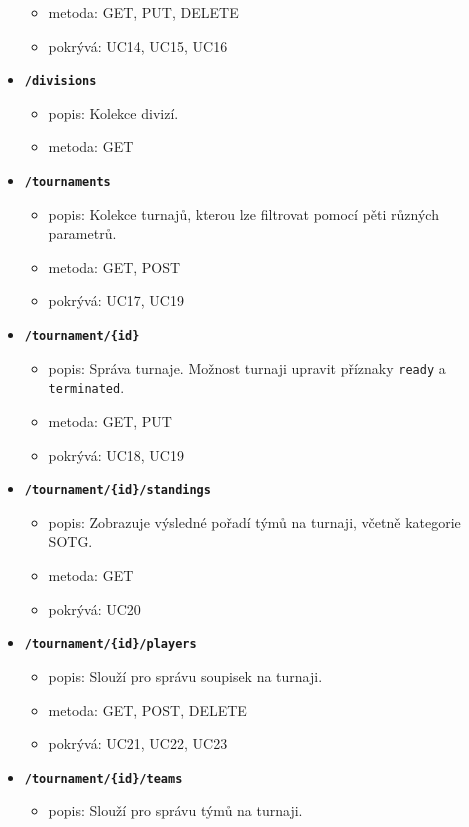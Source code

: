 \begin{itemize}
\begin{itemize}
    \item metoda: GET, PUT, DELETE
    \item pokrývá: UC14, UC15, UC16
  \end{itemize}
  \item \texttt{\textbf{/divisions}}
  \begin{itemize}
    \item popis: Kolekce divizí.
    \item metoda: GET
  \end{itemize}
  \item \texttt{\textbf{/tournaments}}
  \begin{itemize}
    \item popis: Kolekce turnajů, kterou lze filtrovat pomocí pěti různých parametrů.
    \item metoda: GET, POST
    \item pokrývá: UC17, UC19
  \end{itemize}
  \item \texttt{\textbf{/tournament/\{id\}}}
  \begin{itemize}
    \item popis: Správa turnaje. Možnost turnaji upravit příznaky \texttt{ready} a \texttt{terminated}.
    \item metoda: GET, PUT
    \item pokrývá: UC18, UC19
  \end{itemize}
  \item \texttt{\textbf{/tournament/\{id\}/standings}}
  \begin{itemize}
    \item popis: Zobrazuje výsledné pořadí týmů na turnaji, včetně kategorie SOTG.
    \item metoda: GET
    \item pokrývá: UC20
  \end{itemize}
  \item \texttt{\textbf{/tournament/\{id\}/players}}
  \begin{itemize}
    \item popis: Slouží pro správu soupisek na turnaji.
    \item metoda: GET, POST, DELETE
    \item pokrývá: UC21, UC22, UC23
  \end{itemize}
  \item \texttt{\textbf{/tournament/\{id\}/teams}}
  \begin{itemize}
    \item popis: Slouží pro správu týmů na turnaji.

\end{itemize}
\end{itemize}
